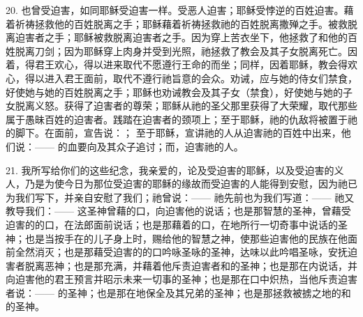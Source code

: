 20. 也曾受迫害，如同耶稣受迫害一样。受恶人迫害；耶稣受悖逆的百姓迫害。藉着祈祷拯救他的百姓脱离之手；耶稣藉着祈祷拯救祂的百姓脱离撒殚之手。被救脱离迫害者之手；耶稣被救脱离迫害者之手。因为穿上苦衣坐下，他拯救了和他的百姓脱离刀剑；因为耶稣穿上肉身并受到光照，祂拯救了教会及其子女脱离死亡。因着，得君王欢心，得以进来取代不愿遵行王命的而坐；同样，因着耶稣，教会得欢心，得以进入君王面前，取代不遵行祂旨意的会众。劝诫，应与她的侍女们禁食，好使她与她的百姓脱离之手；耶稣也劝诫教会及其子女（禁食），好使她与她的子女脱离义怒。获得了迫害者的尊荣；耶稣从祂的圣父那里获得了大荣耀，取代那些属于愚昧百姓的迫害者。践踏在迫害者的颈项上；至于耶稣，祂的仇敌将被置于祂的脚下。在面前，宣告说：； 至于耶稣，宣讲祂的人从迫害祂的百姓中出来，他们说：——   的血要向及其众子追讨；而，迫害祂的人。\par

21. 我所写给你们的这些纪念，我亲爱的，论及受迫害的耶稣，以及受迫害的义人，乃是为使今日为那位受迫害的耶稣的缘故而受迫害的人能得到安慰，因为祂已为我们写下，并亲自安慰了我们；祂曾说：——  祂先前也为我们写道：——   祂又教导我们：——  这圣神曾藉的口，向迫害他的说话；也是那智慧的圣神，曾藉受迫害的的口，在法郎面前说话；也是那藉着的口，在地所行一切奇事中说话的圣神；也是当按手在的儿子身上时，赐给他的智慧之神，使那些迫害他的民族在他面前全然消灭；也是那藉受迫害的的口吟咏圣咏的圣神，达味以此吟唱圣咏，安抚迫害者脱离恶神；也是那充满，并藉着他斥责迫害者和的圣神；也是那在内说话，并向迫害他的君王预言并昭示未来一切事的圣神；也是那在口中炽热，当他斥责迫害者说：——   的圣神；也是那在地保全及其兄弟的圣神；也是那拯救被掳之地的和的圣神。\par

